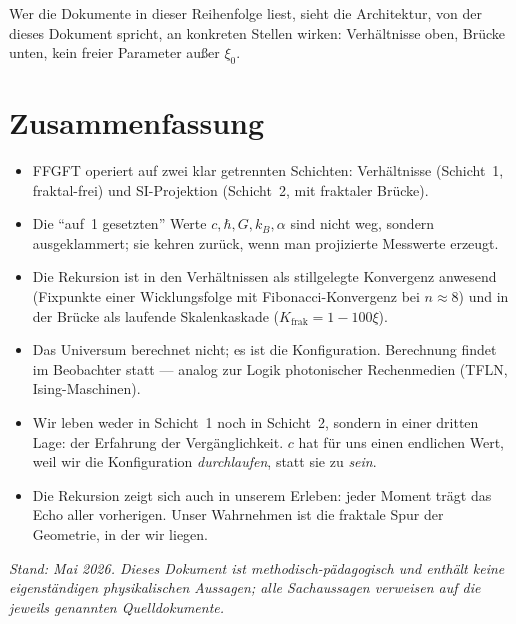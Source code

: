 Wer die Dokumente in dieser Reihenfolge liest, sieht die Architektur, von
der dieses Dokument spricht, an konkreten Stellen wirken: Verhältnisse
oben, Brücke unten, kein freier Parameter außer $\xi_{0}$.

\section*{Zusammenfassung}

\begin{itemize}\setlength\itemsep{2pt}
  \item FFGFT operiert auf zwei klar getrennten Schichten:
        Verhältnisse (Schicht~1, fraktal-frei) und SI-Projektion
        (Schicht~2, mit fraktaler Brücke).
  \item Die ``auf~1 gesetzten'' Werte $c, \hbar, G, k_B, \alpha$ sind
        nicht weg, sondern ausgeklammert; sie kehren zurück, wenn man
        projizierte Messwerte erzeugt.
  \item Die Rekursion ist in den Verhältnissen als stillgelegte
        Konvergenz anwesend (Fixpunkte einer Wicklungsfolge mit
        Fibonacci-Konvergenz bei $n \approx 8$) und in der Brücke als
        laufende Skalenkaskade ($K_{\mathrm{frak}} = 1 - 100\xi$).
  \item Das Universum berechnet nicht; es ist die Konfiguration.
        Berechnung findet im Beobachter statt --- analog zur Logik
        photonischer Rechenmedien (TFLN, Ising-Maschinen).
  \item Wir leben weder in Schicht~1 noch in Schicht~2, sondern in
        einer dritten Lage: der Erfahrung der Vergänglichkeit. $c$ hat
        für uns einen endlichen Wert, weil wir die Konfiguration
        \emph{durchlaufen}, statt sie zu \emph{sein}.
  \item Die Rekursion zeigt sich auch in unserem Erleben: jeder Moment
        trägt das Echo aller vorherigen. Unser Wahrnehmen ist die
        fraktale Spur der Geometrie, in der wir liegen.
\end{itemize}

\medskip
\noindent\textit{Stand: Mai 2026. Dieses Dokument ist
methodisch-pädagogisch und enthält keine eigenständigen physikalischen
Aussagen; alle Sachaussagen verweisen auf die jeweils genannten
Quelldokumente.}
